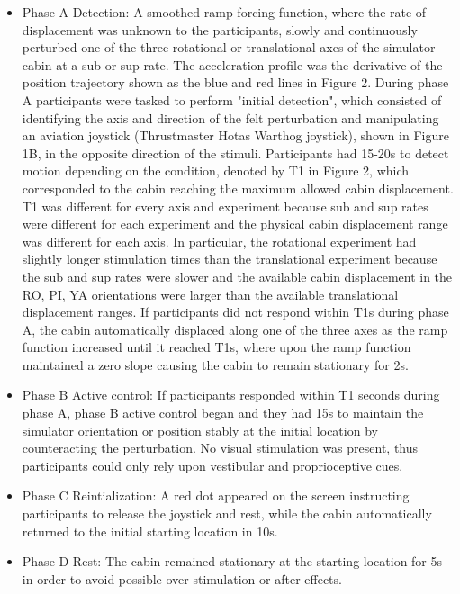\documentclass[11pt, onecolumn]{article}
\begin{document}
\begin{itemize}
\item Phase A Detection:  A smoothed ramp forcing function, where the rate of displacement was unknown to the participants, slowly and continuously perturbed one of the three rotational or translational axes of the simulator cabin at a sub or sup rate.  The acceleration profile was the derivative of the position trajectory shown as the blue and red lines in Figure 2.  During phase A participants were tasked to perform "initial detection", which consisted of identifying the axis and direction of the felt perturbation and manipulating an aviation joystick (Thrustmaster Hotas Warthog joystick), shown in Figure 1B, in the opposite direction of the stimuli.  Participants had 15-20s to detect motion depending on the condition, denoted by T1 in Figure 2, which corresponded to the cabin reaching the maximum allowed cabin displacement.  T1 was different for every axis and experiment because sub and sup rates were different for each experiment and the physical cabin displacement range was different for each axis.  In particular, the rotational experiment had slightly longer stimulation times than the translational experiment because the sub and sup rates were slower and the available cabin displacement in the RO, PI, YA orientations were larger than the available translational displacement ranges.  If participants did not respond within T1s during phase A, the cabin automatically displaced along one of the three axes as the ramp function increased until it reached T1s, where upon the ramp function maintained a zero slope causing the cabin to remain stationary for 2s.
\item Phase B Active control: If participants responded within T1 seconds during phase A, phase B active control began and they had 15s to maintain the simulator orientation or position stably at the initial location by counteracting the perturbation.  No visual stimulation was present, thus participants could only rely upon vestibular and proprioceptive cues.
\item Phase C Reintialization: A red dot appeared on the screen instructing participants to release the joystick and rest, while the cabin automatically returned to the initial starting location in 10s. 
\item Phase D Rest: The cabin remained stationary at the starting location for 5s in order to avoid possible over stimulation or after effects.
\end{itemize}
\end{document}
